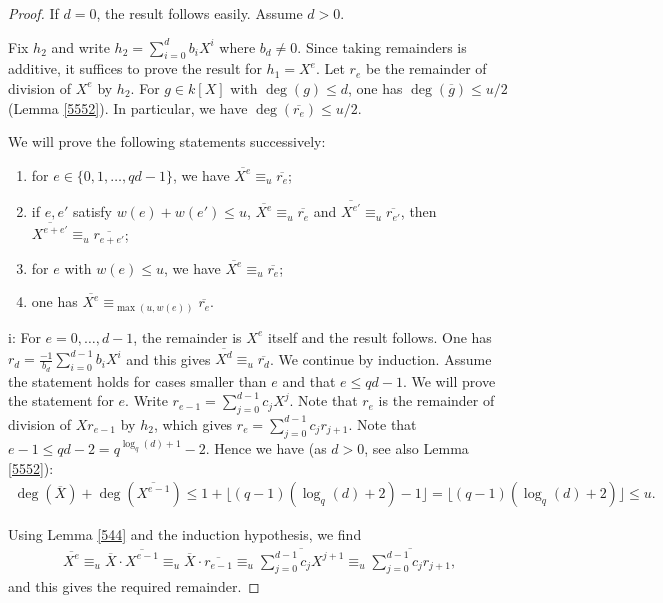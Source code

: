 \documentclass{amsart}
\theoremstyle{plain}
\theoremstyle{definition}
\begin{document}
\begin{proof}
If $d=0$, the result follows easily. Assume $d>0$.

Fix $h_2$ and write $h_2=\sum_{i=0}^{d} b_i X^i$ where $b_{d} \neq 0$.
Since taking remainders is additive, it suffices to prove the result for $h_1=X^e$. Let $r_e$ be the remainder of division of $X^e$ by $h_2$. For $g \in k[X]$ with $\deg(g) \leq d$, one has $\deg(\overline{g}) \leq u/2$ (Lemma \ref{5552}). In particular, we have $\deg(\overline{r_e}) \leq u/2$.

We will prove the following statements successively:
\begin{enumerate}
\item for $e \in \{0,1,\ldots,qd-1\}$, we have $\overline{X^e} \equiv_{u} \overline{r_e}$;
\item if $e, e'$ satisfy $w(e)+w(e') \leq u$, $\overline{X^e} \equiv_{u} \overline{r_e}$ and $\overline{X^{e'}} \equiv_{u} \overline{r_{e'}}$, then
$\overline{X^{e+e'}} \equiv_{u} \overline{r_{e+e'}}$;
\item for $e$ with $w(e) \leq u$, we have $\overline{X^e} \equiv_{u} \overline{r_e}$;
\item one has $\overline{X^e} \equiv_{\max(u,w(e))} \overline{r_e}$.
\end{enumerate}

i: For $e=0,\ldots,d-1$, the remainder is $X^e$ itself and the result follows. One has $r_{d}= \frac{-1}{b_{d}} \sum_{i=0}^{d-1} b_i X^i$ and this gives $\overline{X^{d}} \equiv_{u} \overline{r_{d}}$. We continue by induction. Assume the statement holds for cases smaller than $e$ and that $e \leq qd-1$. We will prove the statement for $e$. Write $r_{e-1}=\sum_{j=0}^{d-1} c_j X^j$. Note that $r_e$ is the remainder of division of $X r_{e-1}$ by $h_2$, which gives $r_e=\sum_{j=0}^{d-1} c_j r_{j+1}$. Note that $e-1\leq qd-2=q^{\log_q(d) +1}-2$. Hence we have (as $d>0$, see also Lemma \ref{5552}):
\begin{eqnarray*}
\deg(\overline{X}) + \deg(\overline{X^{e-1}})  \leq 1 + \lfloor (q-1) \left(\log_q(d) + 2  \right) -1 \rfloor=   \lfloor (q-1) \left( \log_q(d) + 2  \right)\rfloor \leq u.
\end{eqnarray*}

Using Lemma \ref{544} and the induction hypothesis, we find
\begin{eqnarray*}
\overline{X^e} \equiv_{u} \overline{X} \cdot \overline{X^{e-1}} \equiv_{u} \overline{X} \cdot \overline{r_{e-1}} \equiv_{u}
\overline{\sum_{j=0}^{d-1} c_j X^{j+1}}
 \equiv_{u} \overline{ \sum_{j=0}^{d-1} c_j r_{j+1}},
\end{eqnarray*}
and this gives the required remainder.


\end{proof}
\end{document}

